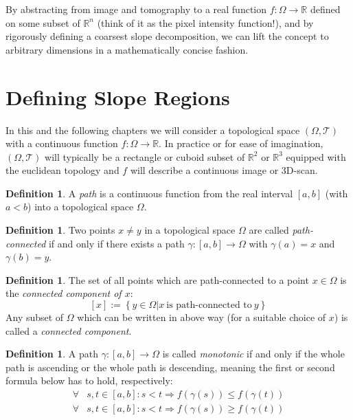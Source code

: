 \documentclass[a4paper,10pt,notitlepage,fullpage]{paper}
\theoremstyle{plain}
\theoremstyle{definition}
\newtheorem{defn}[thm]{Definition} %
\begin{document}
By abstracting from image and tomography to a real function $f: \Omega \rightarrow \mathbb{R}$ defined on some subset of $\mathbb{R}^n$ (think of it as the pixel intensity function!), and by rigorously defining a coarsest slope decomposition, we can lift the concept to arbitrary dimensions in a mathematically concise fashion.

\section{Defining Slope Regions}
\label{sec:definitions}


In this and the following chapters we will consider a topological space $(\Omega, \mathcal T)$ with a continuous function $f: \Omega \to \mathbb{R}$.
In practice or for ease of imagination, $(\Omega, \mathcal T)$ will typically be a rectangle or cuboid subset of $\mathbb R^2$ or $\mathbb R^3$ equipped with the euclidean topology and $f$ will describe a continuous image or 3D-scan.

\begin{defn}
A \emph{path} is a continuous function from the real interval $[a,b]$ (with $a<b$) into a topological space $\Omega$.
\end{defn}


\begin{defn}
Two points $x\neq y$ in a topological space $\Omega$ are called \emph{path-connected} if and only if there exists a path $\gamma: [a,b] \to \Omega$ with $\gamma (a)=x$ and  $\gamma (b)=y$.
\end{defn}

\begin{defn}
The set of all points which are path-connected to a point $x\in\Omega$ is the \emph{connected component of $x$}:
$$[x]:=\left\{ y\in\Omega | x ~\text{is path-connected to}~ y \right\}$$
Any subset of $\Omega$ which can be written in above way (for a suitable choice of $x$) is called a \emph{connected component}.
\end{defn}

\begin{defn}
A path $\gamma: [a,b] \to \Omega$ is called \emph{monotonic} if and only if the whole path is ascending or the whole path is descending, meaning the first or second formula below has to hold, respectively:
\begin{align*}
\forall & s, t \in [a,b]: s < t \Rightarrow f(\gamma(s)) \leq f(\gamma(t))\\
\forall & s, t \in [a,b]: s < t \Rightarrow f(\gamma(s)) \geq f(\gamma(t))
\end{align*}
\end{defn}
\end{document}
